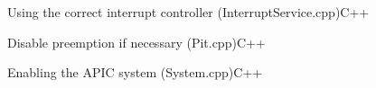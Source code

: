 \begin{codeblock}[label=lst:interruptserviceafter]{Using the correct interrupt controller (InterruptService.cpp)}{C++}
\end{codeblock}

\begin{codeblock}[label=lst:pithandlerafter]{Disable preemption if necessary (Pit.cpp)}{C++}
\end{codeblock}

\begin{codeblock}[label=lst:systemafter]{Enabling the APIC system (System.cpp)}{C++}
\end{codeblock}

\cleardoublepage